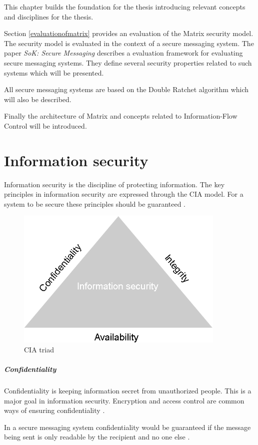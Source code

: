 
This chapter builds the foundation for the thesis introducing relevant concepts and disciplines for the thesis. 


Section \ref{evaluationofmatrix} provides an evaluation of the Matrix security model. The security model is evaluated in the context of a secure messaging system.  
The paper \emph{SoK: Secure Messaging} describes a evaluation framework for evaluating secure messaging systems. They define several security properties related to such systems \cite{sok} which will be presented.


All secure messaging systems are based on the Double Ratchet algorithm which will also be described.


Finally the architecture of Matrix and concepts related to Information-Flow Control will be introduced.

\section{Information security}

Information security is the discipline of protecting information. The key principles in information security are expressed through the CIA model. For a system to be secure these principles should be guaranteed \cite{michael2012}.

\begin{figure}[H]
	\centering
	\includegraphics[width=10cm]{figures/cia.png}
	\caption{CIA triad}
	\label{fig:CIA triad}
\end{figure}


\subparagraph{Confidentiality}
Confidentiality is keeping information secret from unauthorized people. This is a major goal in information security. Encryption and access control are common ways of ensuring confidentiality \cite{michael2012}.

In a secure messaging system confidentiality would be guaranteed if the message being sent is only readable by the recipient and no one else \cite{sok}.

